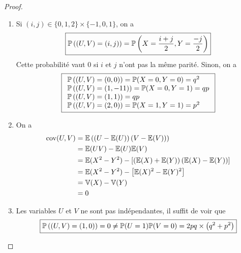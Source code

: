 \documentclass[12pt]{article}
\begin{document}
\begin{proof}
    \phantom{}
    \begin{enumerate}
        \item Si $(i,j)\in\lbrace0,1,2\rbrace\times\lbrace-1,0,1\rbrace$, on a 
        \begin{equation}
            \boxed{\P\left((U,V)=(i,j)\right)=\P\left(X=\frac{i+j}{2},Y=\frac{-j}{2}\right)}
        \end{equation}
        Cette probabilité vaut 0 si $i$ et $j$ n'ont pas la même parité. Sinon, on a 
        \begin{equation}
            \boxed{
                \begin{array}[]{l}
                    \P\left((U,V)=(0,0)\right)=\P(X=0,Y=0)=q^{2}\\
                    \P\left((U,V)=(1,-11)\right)=\P(X=0,Y=1)=qp\\
                    \P\left((U,V)=(1,1)\right)=qp\\
                    \P\left((U,V)=(2,0)\right)=\P(X=1,Y=1)=p^{2}\\
                \end{array}
            }
        \end{equation}

        \item On a 
        \begin{align}
            \mathrm{cov}(U,V)
            &=\E\left(\left(U-\E(U)\right)\left(V-\E(V)\right)\right)\\
            &=\E(UV)-\E(U)\E(V)\\
            &=\E(X^{2}-Y^{2})-\left[\left(\E(X)+\E(Y)\right)\left(\E(X)-\E(Y)\right)\right]\\
            &=\E(X^{2}-Y^{2})-\left[\E(X)^{2}-\E(Y)^{2}\right]\\
            &=\mathbb{V}(X)-\mathbb{V}(Y)\\
            &=0
        \end{align}

        \item Les variables $U$ et $V$ ne sont pas indépendantes, il suffit de voir que 
        \begin{equation}
            \boxed{\P\left((U,V)=(1,0)\right)=0\neq\P(U=1)\P(V=0)=2pq\times\left(q^{2}+p^{2}\right)}
        \end{equation}
    \end{enumerate}
\end{proof}
\end{document}
